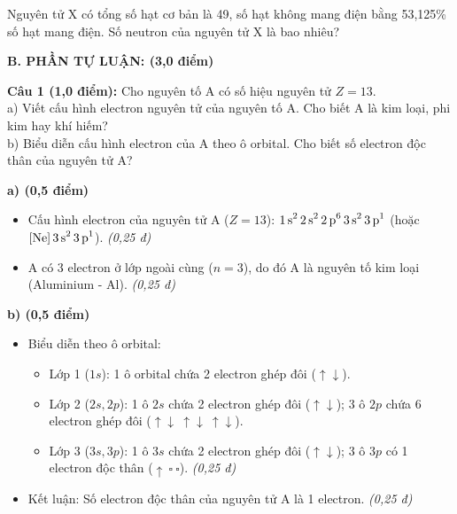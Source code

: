 \documentclass[11pt,a4paper]{article}
\begin{document}
\begin{ex}
Nguyên tử X có tổng số hạt cơ bản là 49, số hạt không mang điện bằng 53,125\% số hạt mang điện. Số neutron của nguyên tử X là bao nhiêu?

\end{ex}
\vspace{6pt}
\noindent
{\color{mainGreen}\textbf{\Large B. PHẦN TỰ LUẬN: (3,0 điểm)}}
\vspace{2pt}

\noindent
\textbf{Câu 1 (1,0 điểm):} Cho nguyên tố A có số hiệu nguyên tử $Z = 13$.\\
a) Viết cấu hình electron nguyên tử của nguyên tố A. Cho biết A là kim loại, phi kim hay khí hiếm?\\
b) Biểu diễn cấu hình electron của A theo ô orbital. Cho biết số electron độc thân của nguyên tử A?

\begin{tcolorbox}[colback=white,colframe=solBlue,title=\textbf{Lời giải chi tiết và Biểu điểm Câu 1:}]
\textbf{a) (0,5 điểm)}
\begin{itemize}[leftmargin=1.0cm]
\item Cấu hình electron của nguyên tử A ($Z = 13$): $\ce{1s^2 2s^2 2p^6 3s^2 3p^1}$ (hoặc $\ce{[Ne] 3s^2 3p^1}$). \hfill \textit{(0,25 đ)}
\item A có 3 electron ở lớp ngoài cùng ($n = 3$), do đó A là nguyên tố kim loại (Aluminium - Al). \hfill \textit{(0,25 đ)}
\end{itemize}
\textbf{b) (0,5 điểm)}
\begin{itemize}[leftmargin=1.0cm]
\item Biểu diễn theo ô orbital:
  \begin{itemize}
  \item Lớp 1 ($1s$): 1 ô orbital chứa 2 electron ghép đôi ($\uparrow\downarrow$).
  \item Lớp 2 ($2s, 2p$): 1 ô $2s$ chứa 2 electron ghép đôi ($\uparrow\downarrow$); 3 ô $2p$ chứa 6 electron ghép đôi ($\uparrow\downarrow\ \uparrow\downarrow\ \uparrow\downarrow$).
  \item Lớp 3 ($3s, 3p$): 1 ô $3s$ chứa 2 electron ghép đôi ($\uparrow\downarrow$); 3 ô $3p$ có 1 electron độc thân ($\uparrow\ \square\ \square$). \hfill \textit{(0,25 đ)}
  \end{itemize}
\item Kết luận: Số electron độc thân của nguyên tử A là 1 electron. \hfill \textit{(0,25 đ)}
\end{itemize}
\end{tcolorbox}
\end{document}
